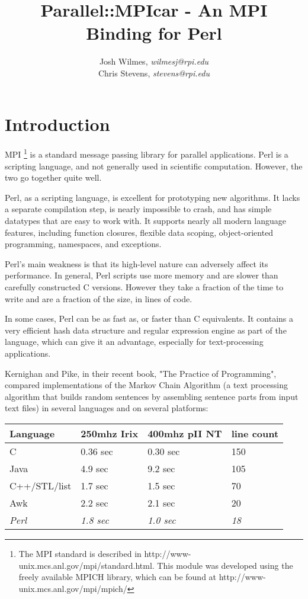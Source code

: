 \documentclass{report}
\title{Parallel::MPIcar - An MPI Binding for Perl}
\author{Josh Wilmes, \textit{wilmesj@rpi.edu}\\
	Chris Stevens, \textit{stevens@rpi.edu}
}
\begin{document}
\maketitle
\section*{Introduction}

MPI \footnote{The MPI standard is described in
http://www-unix.mcs.anl.gov/mpi/standard.html.  This module was
developed using the freely available MPICH library, which can be found 
at http://www-unix.mcs.anl.gov/mpi/mpich/} is a standard message
passing library for parallel applications.  Perl is a scripting
language, and not generally used in scientific computation.   However,
the two go together quite well.

Perl, as a scripting language, is excellent for prototyping new
algorithms.  It lacks a separate compilation step, is nearly
impossible to crash, and has simple datatypes that are easy to
work with.   It supports nearly all modern language features,
including function closures, flexible data scoping, object-oriented
programming, namespaces, and exceptions.

Perl's main weakness is that its high-level nature can 
adversely affect its performance.   In general, Perl scripts use more
memory and are slower than carefully constructed C versions.   However 
they take a fraction of the time to write and are a fraction of the
size, in lines of code.

In some cases, Perl can be as fast as, or faster than C equivalents.
It contains a very efficient hash data structure and regular
expression engine as part of the language, which can give it an
advantage, especially for text-processing applications.

Kernighan and Pike, in their recent book, "The Practice of
Programming", compared implementations of the Markov Chain Algorithm
(a text processing algorithm that builds random	sentences by
assembling sentence parts from input text files) in several languages
and on several platforms:

\begin{center}
\begin{tabular}{|l|l|l|l|}	
        \hline
     \bf{Language}     & \bf{250mhz Irix} & \bf{400mhz pII NT} & \bf{line count}\\ \hline
	C              & 0.36 sec      &  0.30 sec      & 150\\ \hline
	Java           & 4.9 sec       &  9.2 sec       & 105\\ \hline
	C++/STL/list   & 1.7 sec       &  1.5 sec       & 70\\ \hline
	Awk            & 2.2 sec       &  2.1 sec       & 20\\ \hline
\textit{Perl}        &\textit{1.8 sec} &\textit{1.0 sec} & \textit{18} \\ \hline
\end{tabular}
\end{center}
\end{document}

